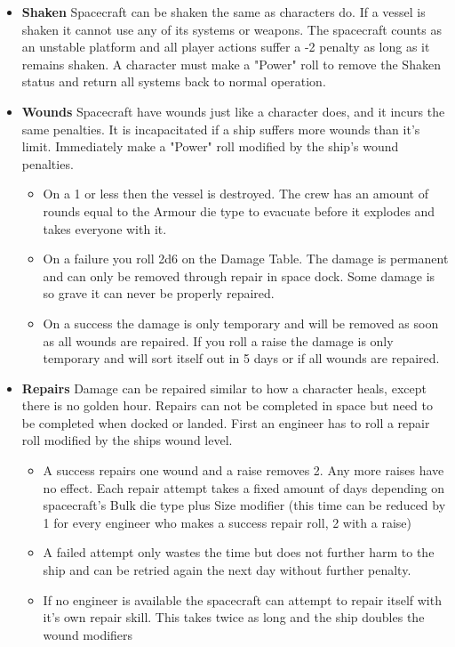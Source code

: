 \begin{multicols}{2}
\begin{itemize}
  \item \textbf{Shaken} Spacecraft can be shaken the same as characters do. If a vessel is shaken it cannot use any of its systems or weapons. The spacecraft counts as an unstable platform and all player actions suffer a -2 penalty as long as it remains shaken. A character must make a "Power" roll to remove the Shaken status and return all systems back to normal operation.
  \item \textbf{Wounds} Spacecraft have wounds just like a character does, and it incurs the same penalties. It is incapacitated if a ship suffers more wounds than it's limit. Immediately make a "Power" roll modified by the ship's wound penalties.
  \begin{itemize}
    \item On a 1 or less then the vessel is destroyed. The crew has an amount of rounds equal to the Armour die type to evacuate before it explodes and takes everyone with it. 
    \item On a failure you roll 2d6 on the Damage Table. The damage is permanent and can only be removed through repair in space dock. Some damage is so grave it can never be properly repaired.
    \item On a success the damage is only temporary and will be removed as soon as all wounds are repaired. If you roll a raise the damage is only temporary and will sort itself out in 5 days or if all wounds are repaired.
  \end{itemize}
  \item \textbf{Repairs} Damage can be repaired similar to how a character heals, except there is no golden hour. Repairs can not be completed in space but need to be completed when docked or landed. First an engineer has to roll a repair roll modified by the ships wound level. 
  \begin{itemize}
    \item A success repairs one wound and a raise removes 2. Any more raises have no effect. Each repair attempt takes a fixed amount of days depending on spacecraft's Bulk die type plus Size modifier (this time can be reduced by 1 for every engineer who makes a success repair roll, 2 with a raise)
    \item A failed attempt only wastes the time but does not further harm to the ship and can be retried again the next day without further penalty.
    \item If no engineer is available the spacecraft can attempt to repair itself with it's own repair skill. This takes twice as long and the ship doubles the wound modifiers

\end{itemize}
\end{itemize}
\end{multicols}
